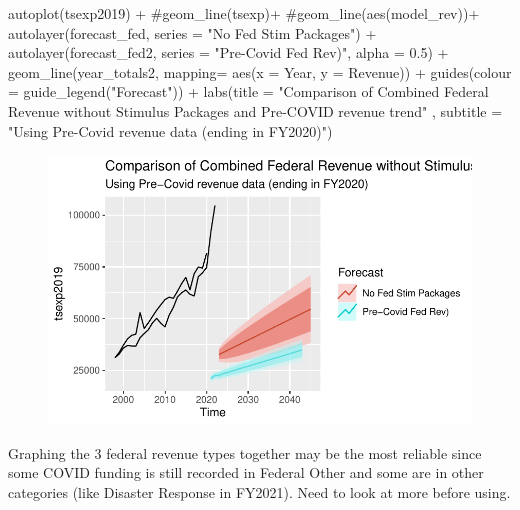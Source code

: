 \documentclass[
  letterpaper,
  DIV=11,
  numbers=noendperiod]{scrreport}
\newenvironment{Shaded}{\begin{snugshade}}{\end{snugshade}}
\newcommand{\AttributeTok}[1]{\textcolor[rgb]{0.40,0.45,0.13}{#1}}
\newcommand{\CommentTok}[1]{\textcolor[rgb]{0.37,0.37,0.37}{#1}}
\newcommand{\FloatTok}[1]{\textcolor[rgb]{0.68,0.00,0.00}{#1}}
\newcommand{\FunctionTok}[1]{\textcolor[rgb]{0.28,0.35,0.67}{#1}}
\newcommand{\NormalTok}[1]{\textcolor[rgb]{0.00,0.23,0.31}{#1}}
\newcommand{\SpecialCharTok}[1]{\textcolor[rgb]{0.37,0.37,0.37}{#1}}
\newcommand{\StringTok}[1]{\textcolor[rgb]{0.13,0.47,0.30}{#1}}
\begin{document}
\begin{Shaded}
\begin{Highlighting}[]
\FunctionTok{autoplot}\NormalTok{(tsexp2019) }\SpecialCharTok{+}
  \CommentTok{\#geom\_line(tsexp)+}
  \CommentTok{\#geom\_line(aes(model\_rev))+}
  \FunctionTok{autolayer}\NormalTok{(forecast\_fed, }\AttributeTok{series =} \StringTok{"No Fed Stim Packages"}\NormalTok{) }\SpecialCharTok{+}
  \FunctionTok{autolayer}\NormalTok{(forecast\_fed2, }\AttributeTok{series =} \StringTok{"Pre{-}Covid Fed Rev)"}\NormalTok{, }\AttributeTok{alpha =} \FloatTok{0.5}\NormalTok{) }\SpecialCharTok{+}
  \FunctionTok{geom\_line}\NormalTok{(year\_totals2, }\AttributeTok{mapping=} \FunctionTok{aes}\NormalTok{(}\AttributeTok{x =}\NormalTok{ Year, }\AttributeTok{y =}\NormalTok{ Revenue))  }\SpecialCharTok{+} 
  \FunctionTok{guides}\NormalTok{(}\AttributeTok{colour =} \FunctionTok{guide\_legend}\NormalTok{(}\StringTok{"Forecast"}\NormalTok{)) }\SpecialCharTok{+} 
  \FunctionTok{labs}\NormalTok{(}\AttributeTok{title =} \StringTok{"Comparison of Combined Federal Revenue without Stimulus Packages and Pre{-}COVID revenue trend"}\NormalTok{ , }
       \AttributeTok{subtitle =} \StringTok{"Using Pre{-}Covid revenue data (ending in FY2020)"}\NormalTok{)}
\end{Highlighting}
\end{Shaded}

\begin{figure}[H]

{\centering \includegraphics{./Everything_files/figure-pdf/unnamed-chunk-33-3.pdf}

}

\end{figure}

Graphing the 3 federal revenue types together may be the most reliable
since some COVID funding is still recorded in Federal Other and some are
in other categories (like Disaster Response in FY2021). Need to look at
more before using.
\end{document}
